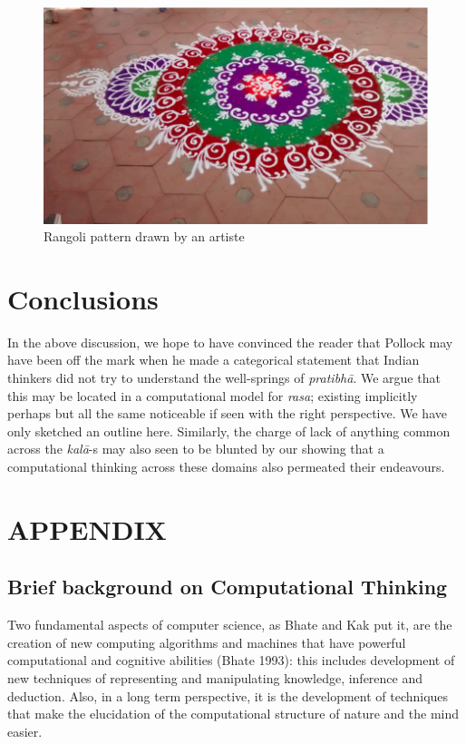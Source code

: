 \begin{figure}[H]
\centering
\includegraphics[scale=.8]{figures/8.eps}
\caption{Rangoli pattern drawn by an artiste}\label{chap7-fig6}
\end{figure}

\section{Conclusions}\label{chap7-sec6}

In the above discussion, we hope to have convinced the reader that Pollock may have been off the mark when he made a categorical statement that Indian thinkers did not try to understand the well-springs of \textsl{pratibhā}. We argue that this may be located in a computational model for \textsl{rasa}; existing implicitly perhaps but all the same noticeable if seen with the right perspective. We have only sketched an outline here. Similarly, the charge of lack of anything common across the \textsl{kalā}-s may also seen to be blunted by our showing that a computational thinking across these domains also permeated their endeavours.

\appendix
\section{APPENDIX}\label{chap7-app1}


\subsection*{Brief background on Computational Thinking}

Two fundamental aspects of computer science, as Bhate and Kak put it, are the creation of new computing algorithms and machines that have powerful computational and cognitive abilities (Bhate 1993): this includes development of new techniques of representing and manipulating knowledge, inference and deduction. Also, in a long term perspective, it is the development of techniques that make the elucidation of the computational structure of nature and the mind easier.

